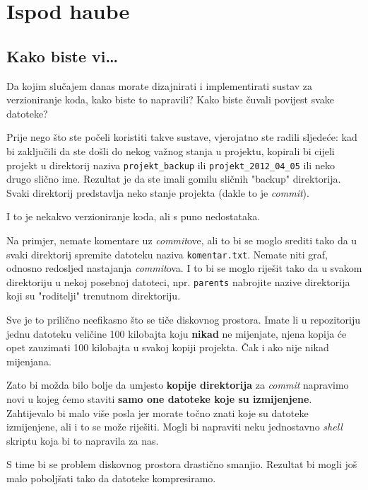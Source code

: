 \chapter*{Ispod haube}

\section*{Kako biste vi\dots}

Da kojim slučajem danas morate dizajnirati i implementirati sustav za verzioniranje koda, kako biste to napravili?
Kako biste čuvali povijest svake datoteke?

Prije nego što ste počeli koristiti takve sustave, vjerojatno ste radili sljedeće: kad bi zaključili da ste došli do nekog važnog stanja u projektu, kopirali bi cijeli projekt u direktorij naziva \verb+projekt_backup+ ili \verb+projekt_2012_04_05+ ili neko drugo slično ime.
Rezultat je da ste imali gomilu sličnih "backup" direktorija.
Svaki direktorij predstavlja neko stanje projekta (dakle to je \emph{commit}).

I to je nekakvo verzioniranje koda, ali s puno nedostataka.

Na primjer, nemate komentare uz \emph{commit}ove, ali to bi se moglo srediti tako da u svaki direktorij spremite datoteku naziva \verb+komentar.txt+.
Nemate niti graf, odnosno redosljed nastajanja \emph{commit}ova.
I to bi se moglo riješit tako da u svakom direktoriju u nekoj posebnoj datoteci, npr. \verb+parents+ nabrojite nazive direktorija koji su "roditelji" trenutnom direktoriju.

Sve je to prilično neefikasno što se tiče diskovnog prostora. 
Imate li u repozitoriju jednu datoteku veličine 100 kilobajta koju \textbf{nikad} ne mijenjate, njena kopija će opet zauzimati 100 kilobajta u svakoj kopiji projekta.
Čak i ako nije nikad mijenjana.

Zato bi možda bilo bolje da umjesto \textbf{kopije direktorija} za \emph{commit} napravimo novi u kojeg ćemo staviti \textbf{samo one datoteke koje su izmijenjene}.
Zahtijevalo bi malo više posla jer morate točno znati koje su datoteke izmijenjene, ali i to se može riješiti.
Mogli bi napraviti neku jednostavno \emph{shell} skriptu koja bi to napravila za nas. 

S time bi se problem diskovnog prostora drastično smanjio. 
Rezultat bi mogli još malo poboljšati tako da datoteke kompresiramo.

